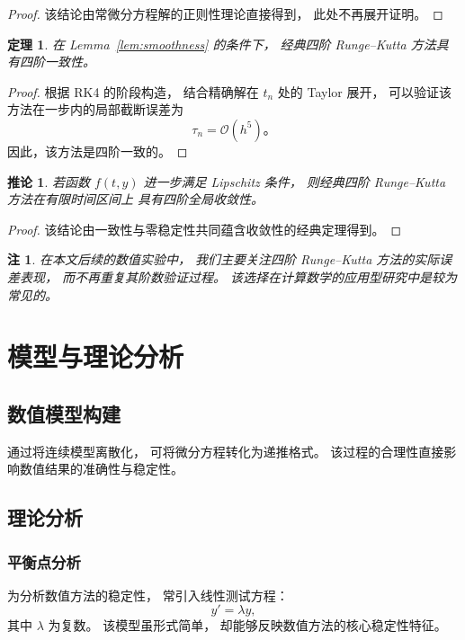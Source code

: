\documentclass[UTF8, a4paper, zihao=-4]{ctexart} %
\newtheorem{theorem}{定理}[section]%
\newtheorem{corollary}{推论}[section]
\newtheorem{rmk}{注}[section]
\numberwithin{equation}{section}%
\begin{document}
\begin{proof}
该结论由常微分方程解的正则性理论直接得到，
此处不再展开证明。
\end{proof}

\begin{theorem}
\label{thm:rk4_order}
在 Lemma~\ref{lem:smoothness} 的条件下，
经典四阶 Runge--Kutta 方法具有四阶一致性。
\end{theorem}

\begin{proof}
根据 RK4 的阶段构造，
结合精确解在 $t_n$ 处的 Taylor 展开，
可以验证该方法在一步内的局部截断误差为
\[
\tau_n = \mathcal{O}(h^5)。
\]
因此，该方法是四阶一致的。
\end{proof}

\begin{corollary}
若函数 $f(t,y)$ 进一步满足 Lipschitz 条件，
则经典四阶 Runge--Kutta 方法在有限时间区间上
具有四阶全局收敛性。
\end{corollary}

\begin{proof}
该结论由一致性与零稳定性共同蕴含收敛性的经典定理得到。
\end{proof}

\begin{rmk}
在本文后续的数值实验中，
我们主要关注四阶 Runge--Kutta 方法的实际误差表现，
而不再重复其阶数验证过程。
该选择在计算数学的应用型研究中是较为常见的。
\end{rmk}


\newpage
\section{模型与理论分析}

\subsection{数值模型构建}

通过将连续模型离散化，
可将微分方程转化为递推格式。
该过程的合理性直接影响数值结果的准确性与稳定性。

\subsection{理论分析}

\subsubsection{平衡点分析}

为分析数值方法的稳定性，
常引入线性测试方程：
\begin{equation}
y' = \lambda y,
\end{equation}
其中 $\lambda$ 为复数。
该模型虽形式简单，
却能够反映数值方法的核心稳定性特征。
\end{document}
